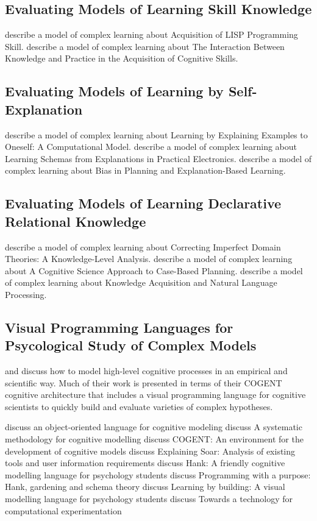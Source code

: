 \subsection{Evaluating Models of Learning Skill Knowledge}
\cite{anderson1993alps} describe a model of complex learning about Acquisition of LISP Programming Skill.
\cite{ohlsson1993ibkpacs} describe a model of complex learning about The Interaction Between Knowledge and Practice in the Acquisition of Cognitive Skills.

\subsection{Evaluating Models of Learning by Self-Explanation}
\cite{vanlehn1993lbeeo} describe a model of complex learning about Learning by Explaining Examples to Oneself: A Computational Model.
\cite{kieras1993lsepe} describe a model of complex learning about Learning Schemas from Explanations in Practical Electronics.
\cite{rosenbloom1993bpebl} describe a model of complex learning about Bias in Planning and Explanation-Based Learning.

\subsection{Evaluating Models of Learning Declarative Relational Knowledge}
\cite{huffman1993cidt} describe a model of complex learning about Correcting Imperfect Domain Theories: A Knowledge-Level Analysis.
\cite{hammond1993csacbp} describe a model of complex learning about A Cognitive Science Approach to Case-Based Planning.
\cite{wilensky1993kanlp} describe a model of complex learning about Knowledge Acquisition and Natural Language Processing.

\subsection{Visual Programming Languages for Psycological Study of Complex Models}

\cite{cooper2002mhl} and \cite{cooper1998cvd} discuss how to model high-level cognitive processes in an empirical and scientific way.
Much of their work is presented in terms of their COGENT cognitive architecture that includes a visual programming language for cognitive scientists to quickly build and evaluate varieties of complex hypotheses.

\cite{cooper1995too} discuss an object-oriented language for cognitive modeling
\cite{cooper1996smc} discuss A systematic methodology for cognitive modelling
\cite{cooper1998ced} discuss COGENT: An environment for the development of cognitive models
\cite{councill2003esa} discuss Explaining Soar: Analysis of existing tools and user information requirements
\cite{mulholland1998hfc} discuss Hank: A friendly cognitive modelling language for psychology students
\cite{mulholland1999pph} discuss Programming with a purpose: Hank, gardening and schema theory
\cite{mulholland2000lbv} discuss Learning by building: A visual modelling language for psychology students
\cite{yule2001ttc} discuss Towards a technology for computational experimentation

